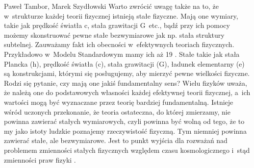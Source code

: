 \begin{artplenv}{Paweł Tambor, Marek Szydłowski}
Warto zwrócić uwagę także na to, że w~strukturze każdej teorii fizycznej istnieją stałe fizyczne. Mają one wymiary, takie jak prędkość światła c, stała grawitacji G~etc., bądź przy ich pomocy możemy skonstruować pewne stałe bezwymiarowe jak np. stała struktury subtelnej. Zauważamy fakt ich obecności w~efektywnych teoriach fizycznych. Przykładowo w~Modelu Standardowym mamy ich aż 19
\parencite[][]{duff_how_2014}. %
 Stałe takie jak stała Plancka (h), prędkość światła (c), stała grawitacji (G), ładunek elementarny (e) są konstrukcjami, którymi się posługujemy, aby mierzyć pewne wielkości fizyczne. Rodzi się pytanie, czy mają one jakiś fundamentalny sens? Wielu fizyków uważa, że należą one do podstawowych własności każdej efektywnej teorii fizycznej, a~ich wartości mogą być wyznaczane przez teorię bardziej fundamentalną. Istnieje wśród uczonych przekonanie, że teoria ostateczna, do której zmierzamy, nie powinna zawierać stałych wymiarowych, czyli powinna być wolną od tego, że to my jako istoty ludzkie poznajemy rzeczywistość fizyczną. Tym niemniej powinna zawierać stałe, ale bezwymiarowe. Jest to punkt wyjścia dla rozważań nad problemem zmienności stałych fizycznych względem czasu kosmologicznego i~stąd zmienności praw fizyki 
\parencite[][]{volovik_fundamental_2002}.%



\end{artplenv}
